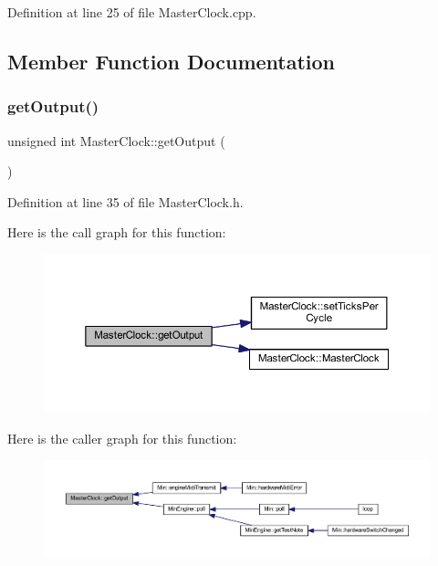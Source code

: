 Definition at line 25 of file Master\+Clock.\+cpp.



\subsection{Member Function Documentation}
\mbox{\label{class_master_clock_af63318129f4c13824614e73f549e5894}} 
\subsubsection{\texorpdfstring{get\+Output()}{getOutput()}}
{\footnotesize\ttfamily unsigned int Master\+Clock\+::get\+Output (\begin{DoxyParamCaption}{ }\end{DoxyParamCaption})\hspace{0.3cm}{\ttfamily [inline]}}



Definition at line 35 of file Master\+Clock.\+h.

Here is the call graph for this function\+:
\nopagebreak
\begin{figure}[H]
\begin{center}
\leavevmode
\includegraphics[width=350pt]{d6/dc3/class_master_clock_af63318129f4c13824614e73f549e5894_cgraph}
\end{center}
\end{figure}
Here is the caller graph for this function\+:
\nopagebreak
\begin{figure}[H]
\begin{center}
\leavevmode
\includegraphics[width=350pt]{d6/dc3/class_master_clock_af63318129f4c13824614e73f549e5894_icgraph}
\end{center}
\end{figure}
\mbox{\label{class_master_clock_ae6c0b35db2932b94ec823eac80347707}} 
